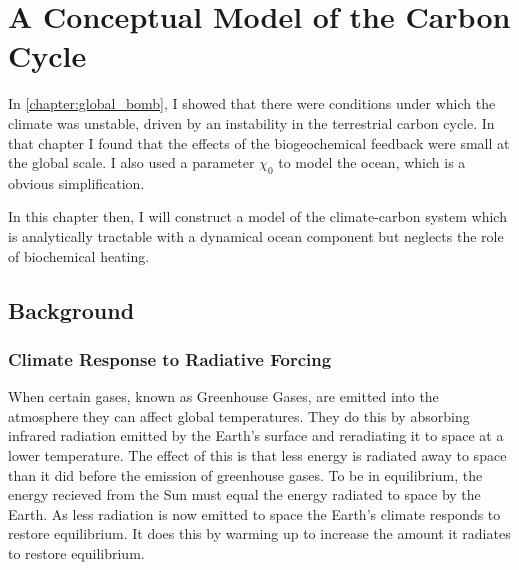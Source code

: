 \chapter{A Conceptual Model of the Carbon Cycle}
\label{chapter:conceptual_carbon_cycle}
\graphicspath{{box_ocean/figs/}}

In \cref{chapter:global_bomb}, I showed that there were conditions under which the climate was unstable,
driven by an instability in the terrestrial carbon cycle. In that chapter I found that the effects of
the biogeochemical feedback were small at the global scale. I also used a parameter $\chi_0$ to model the ocean,
which is a obvious simplification.

In this chapter then, I will construct a model of the climate-carbon system which is analytically tractable
with a dynamical ocean component but neglects the role of biochemical heating.

\section{Background}

\subsection{Climate Response to Radiative Forcing}
When certain gases, known as Greenhouse Gases, are emitted into the atmosphere they can affect global temperatures.
They do this by absorbing infrared radiation emitted by the Earth's surface and reradiating it to space at a lower temperature.
The effect of this is that less energy is radiated away to space than it did before the emission of greenhouse gases. To be in
equilibrium, the energy recieved from the Sun must equal the energy radiated to space by the Earth. As less radiation is now
emitted to space the Earth's climate responds to restore equilibrium. It does this by warming up to increase the amount it
radiates to restore equilibrium.

